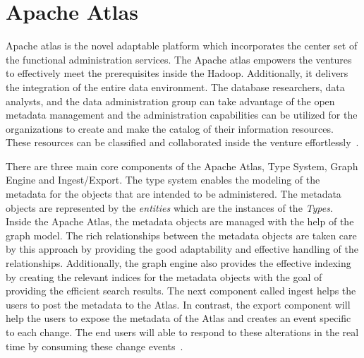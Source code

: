 \section{Apache Atlas}

Apache atlas is the novel adaptable platform which incorporates the
center set of the functional administration services. The Apache atlas
empowers the ventures to effectively meet the prerequisites inside the
Hadoop.  Additionally, it delivers the integration of the entire data
environment.  The database researchers, data analysts, and the data
administration group can take advantage of the open metadata
management and the administration capabilities can be utilized for the
organizations to create and make the catalog of their information
resources. These resources can be classified and collaborated inside
the venture effortlessly~\cite{hid-sp18-412-Apache_Atlas_by_Maven}.

There are three main core components of the Apache Atlas, Type System,
Graph Engine and Ingest/Export. The type system enables the modeling
of the metadata for the objects that are intended to be administered.
The metadata objects are represented by the \textit{entities} which
are the instances of the \textit{Types}. Inside the Apache Atlas, the
metadata objects are managed with the help of the graph model. The
rich relationships between the metadata objects are taken care by this
approach by providing the good adaptability and effective handling of
the relationships. Additionally, the graph engine also provides the
effective indexing by creating the relevant indices for the metadata
objects with the goal of providing the efficient search results. The
next component called ingest helps the users to post the metadata to
the Atlas. In contrast, the export component will help the users to
expose the metadata of the Atlas and creates an event specific to each
change. The end users will able to respond to these alterations in the
real time by consuming these change
events~\cite{hid-sp18-412-Apache_Atlas_architecture}.

